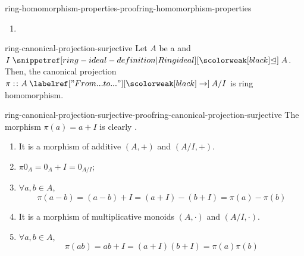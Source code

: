 \documentclass[preview]{standalone}
\begin{document}
\begin{snippetproof}{ring-homomorphism-properties-proof}{ring-homomorphism-properties}{}
\begin{enumerate}
\begin{enumerate}
\begin{align*}
                \varphi(xa) = \varphi(x) \cdot \varphi(a) = 0_B \cdot \varphi(a) = 0_B
            \end{align*}
            it is thus a .
            \item {}
        \end{enumerate}
    \end{enumerate}
\end{snippetproof}

\begin{snippetproposition}{ring-canonical-projection-surjective}{}
    Let \(A\) be a \ring and \(I \idealin A\).
    Then, the canonical projection \(\pi: \colon A \fromto A/I\)
    is \surjective ring homomorphism. %
\end{snippetproposition}

\begin{snippetproof}{ring-canonical-projection-surjective-proof}{ring-canonical-projection-surjective}{}
    The morphism \(\pi(a) = a + I\) is clearly \surjective.
    \begin{enumerate}
        \item It is a morphism of additive \group[groups]
            \((A,+)\) and \((A/I, +)\).
        \item \(\pi 0_A = 0_A + I = 0_{A/I}\);
        \item \(\forall a,b \in A\), \[\pi(a-b) = (a-b) + I = (a+I) - (b+I) = \pi(a) - \pi(b)\]
        \item It is a morphism of multiplicative monoids \((A, \cdot)\)
        and \((A/I, \cdot)\).
        \item \(\forall a,b \in A\),
        \[
            \pi(ab) = ab+I = (a+I)(b+I) = \pi(a)\pi(b)
        \]
    \end{enumerate}
\end{snippetproof}
\end{document}

